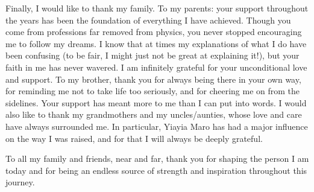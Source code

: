 \documentclass[12pt, a4paper, twoside]{report}
\begin{document}
Finally, I would like to thank my family. To my parents: your support throughout the years has been the foundation of everything I have achieved. Though you come from professions far removed from physics, you never stopped encouraging me to follow my dreams. I know that at times my explanations of what I do have been confusing (to be fair, I might just not be great at explaining it!), but your faith in me has never wavered. I am infinitely grateful for your unconditional love and support. To my brother, thank you for always being there in your own way, for reminding me not to take life too seriously, and for cheering me on from the sidelines. Your support has meant more to me than I can put into words. I would also like to thank my grandmothers and my uncles/aunties, whose love and care have always surrounded me. In particular, Yiayia Maro has had a major influence on the way I was raised, and for that I will always be deeply grateful. 

To all my family and friends, near and far, thank you for shaping the person I am today and for being an endless source of strength and inspiration throughout this journey.  

\tableofcontents
\listoffigures
\listoftables

\clearpage
\end{document}
